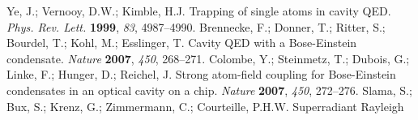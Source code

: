 \documentclass[atoms,article,accept,moreauthors,pdftex,12pt,a4paper]{mdpi}
\begin{document}
\begin{thebibliography}{----}
Ye, J.; Vernooy, D.W.; Kimble, H.J. Trapping of single atoms in cavity QED. {\em Phys. Rev. Lett.} {\bf 1999}, {\em 83}, 4987--4990.
Brennecke, F.; Donner, T.; Ritter, S.; Bourdel, T.; Kohl, M.; Esslinger, T. Cavity QED with a Bose-Einstein condensate. {\em Nature} {\bf 2007}, {\em 450},  268--271.
Colombe, Y.; Steinmetz, T.; Dubois, G.; Linke, F.; Hunger, D.; Reichel, J. Strong atom-field coupling for Bose-Einstein condensates in an optical cavity on a chip. {\em Nature} {\bf 2007}, {\em 450}, 272--276.
Slama, S.; Bux, S.; Krenz, G.; Zimmermann, C.; Courteille, P.H.W. Superradiant Rayleigh 

\end{thebibliography}
\end{document}
